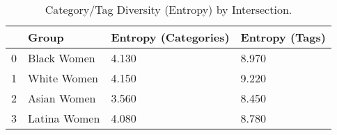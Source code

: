 \begin{table}[htbp]
\centering
\caption{Category/Tag Diversity (Entropy) by Intersection.}
\label{tab:eda_entropy_by_group}
\begin{tabular}{llll}
\toprule
 & Group & Entropy (Categories) & Entropy (Tags) \\
\midrule
0 & Black Women & 4.130 & 8.970 \\
1 & White Women & 4.150 & 9.220 \\
2 & Asian Women & 3.560 & 8.450 \\
3 & Latina Women & 4.080 & 8.780 \\
\bottomrule
\end{tabular}

\end{table}